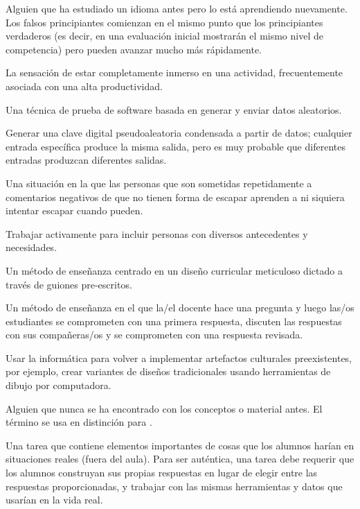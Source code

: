 \begin{description}
 Alguien que ha estudiado un idioma antes pero lo está aprendiendo nuevamente. Los falsos principiantes comienzan en el mismo punto que los principiantes verdaderos (es decir, en una evaluación inicial mostrarán el mismo nivel de competencia) pero pueden avanzar mucho más rápidamente.

 La sensación de estar completamente inmerso en una actividad, 
frecuentemente asociada con una alta productividad.

 Una técnica de prueba de software 
basada en generar y enviar datos aleatorios.

 Generar una clave digital pseudoaleatoria condensada a partir de datos; cualquier entrada específica produce la misma salida, pero es muy probable que diferentes entradas produzcan diferentes salidas.

 Una situación en la que las personas que son sometidas repetidamente a comentarios negativos de que no tienen forma de escapar aprenden a ni siquiera intentar escapar cuando pueden.

 Trabajar activamente para incluir 
personas con diversos antecedentes y necesidades.

 Un método de enseñanza centrado 
en un diseño curricular meticuloso dictado a través de guiones pre-escritos.

 Un método de enseñanza en el que la/el docente hace una pregunta y luego las/os estudiantes se comprometen con una primera respuesta, discuten las respuestas con sus compañeras/os y se comprometen con una respuesta revisada.

 Usar la informática 
para volver a implementar artefactos culturales preexistentes, por ejemplo, 
crear variantes de diseños tradicionales usando herramientas de dibujo por computadora.

 Alguien que nunca se ha
encontrado con los conceptos o material antes. El término se usa en distinción para
.




 Una tarea que contiene elementos importantes 
de cosas que los alumnos harían en situaciones reales (fuera del aula). Para 
ser auténtica, una tarea debe requerir que los alumnos construyan sus propias respuestas
en lugar de elegir entre las respuestas proporcionadas, y trabajar con las mismas 
herramientas y datos que usarían en la vida real.



\end{description}
